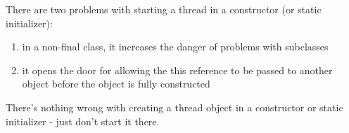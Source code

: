 There are two problems with starting a thread in a constructor (or static initializer):

\begin{enumerate}
    \item in a non-final class, it increases the danger of problems with subclasses
    \item it opens the door for allowing the this reference to be passed to another object before the object is fully constructed
\end{enumerate}
    

There’s nothing wrong with creating a thread object in a constructor or static initializer - just don’t start it there.